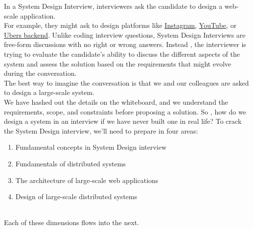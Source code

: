 

In a System Design Interview, interviewers ask the candidate to design a web-scale application.
\\
For example, they might ask to design platforms like \href{https://www.educative.io/courses/grokking-the-system-design-interview/system-design-instagram}{\ul{Instagram}}, \href{https://www.educative.io/courses/grokking-the-system-design-interview/system-design-youtube}{YouTube}, or \href{https://www.educative.io/courses/grokking-the-system-design-interview/system-design-uber}{\ul{Uber\textquotesingle s backend}}. Unlike coding interview questions, System Design Interviews are free-form discussions with no right or wrong answers. Instead , the interviewer is trying to evaluate the candidate's ability to discuss the different aspects of the system and assess the solution based on the requirements that might evolve during the conversation.
\\
The best way to imagine the conversation is that we and our colleagues are asked to design a large-scale system.
\\
We have hashed out the details on the whiteboard, and we understand the requirements, scope, and constraints before proposing a solution. So , how do we design a system in an interview if we have never built one in real life? To crack the System Design interview, we'll need to prepare in four areas:

\begin{enumerate}
\item
\protect{}\label{sytf57PllWobmyQmw6daA}
Fundamental concepts in System Design interview
\item
\protect{}\label{C9bbfB2bmR6Q8zH_uli46}
Fundamentals of distributed systems
\item
\protect{}\label{nIOMkubVDfxaL-82Zl6a-}
The architecture of large-scale web applications
\item
\protect{}\label{fZTijF1c8rfdHYH2hGOLh}
Design of large-scale distributed systems
\end{enumerate}
\\
Each of these dimensions flows into the next.

